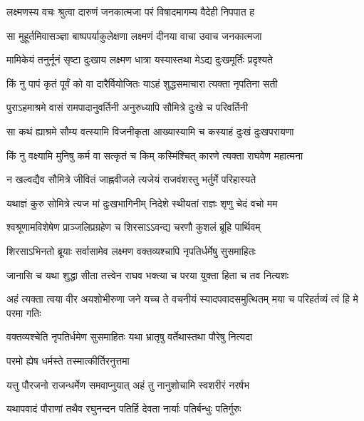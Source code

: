 
\twolineshloka
{लक्ष्मणस्य वचः श्रुत्वा दारुणं जनकात्मजा}
{परं विषादमागम्य वैदेही निपपात ह} %

\twolineshloka
{सा मुहूर्तमिवासञ्ज्ञा बाष्पपर्याकुलेक्षणा}
{लक्ष्मणं दीनया वाचा उवाच जनकात्मजा} %

\twolineshloka
{मामिकेयं तनुर्नूनं सृष्टा दुःखाय लक्ष्मण}
{धात्रा यस्यास्तथा मेऽद्य दुःखमूर्तिः प्रदृश्यते} %

\twolineshloka
{किं नु पापं कृतं पूर्वं को वा दारैर्वियोजितः}
{याऽहं शुद्धसमाचारा त्यक्ता नृपतिना सती} %

\twolineshloka
{पुराऽहमाश्रमे वासं रामपादानुवर्तिनी}
{अनुरुध्यापि सौमित्रे दुःखे च परिवर्तिनी} %

\twolineshloka
{सा कथं ह्याश्रमे सौम्य वत्स्यामि विजनीकृता}
{आख्यास्यामि च कस्याहं दुःखं दुःखपरायणा} %

\twolineshloka
{किं नु वक्ष्यामि मुनिषु कर्म वा सत्कृतं च किम्}
{कस्मिंश्चित् कारणे त्यक्ता राघवेण महात्मना} %

\twolineshloka
{न खल्वद्यैव सौमित्रे जीवितं जाह्नवीजले}
{त्यजेयं राजवंशस्तु भर्तुर्मे परिहास्यते} %

\twolineshloka
{यथाज्ञं कुरु सोमित्रे त्यज मां दुःखभागिनीम्}
{निदेशे स्थीयतां राज्ञः शृणु चेदं वचो मम} %

\twolineshloka
{श्वश्रूणामविशेषेण प्राञ्जलिप्रग्रहेण च}
{शिरसाऽऽवन्द्य चरणौ कुशलं ब्रूहि पार्थिवम्} %

\twolineshloka
{शिरसाऽभिनतो ब्रूयाः सर्वासामेव लक्ष्मण}
{वक्तव्यश्चापि नृपतिर्धर्मेषु सुसमाहितः} %

\twolineshloka
{जानासि च यथा शुद्धा सीता तत्त्वेन राघव}
{भक्त्या च परया युक्ता हिता च तव नित्यशः} %

\threelineshloka
{अहं त्यक्ता त्वया वीर अयशोभीरुणा जने}
{यच्च ते वचनीयं स्यादपवादसमुत्थितम्}
{मया च परिहर्तव्यं त्वं हि मे परमा गतिः} %

\twolineshloka
{वक्तव्यश्चेति नृपतिर्धमेण सुसमाहितः}
{यथा भ्रातृषु वर्तेथास्तथा पौरेषु नित्यदा} %

\onelineshloka
{परमो ह्येष धर्मस्ते तस्मात्कीर्तिरनुत्तमा} %

\twolineshloka
{यत्तु पौरजनो राजन्धर्मेण समवाप्नुयात्}
{अहं तु नानुशोचामि स्वशरीरं नरर्षभ} %

\twolineshloka
{यथापवादं पौराणां तथैव रघुनन्दन}
{पतिर्हि देवता नार्याः पतिर्बन्धुः पतिर्गुरुः} %

